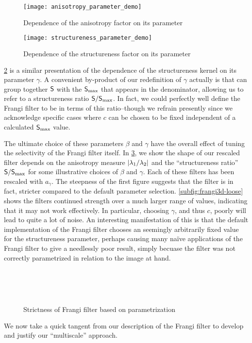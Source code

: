 \begin{figure}[t] \centering
  \texttt{[image: anisotropy\_parameter\_demo]}
  \caption{Dependence of the anisotropy factor on its parameter}
  \label{fig:anisotropy-parameter-demo}
\end{figure}

\begin{figure}[t] \centering
  \texttt{[image: structureness\_parameter\_demo]}
  \caption{Dependence of the structureness factor on its parameter}
  \label{fig:structureness-parameter-demo}
\end{figure}

\cref{fig:structureness-parameter-demo} is a similar presentation of the dependence of the structureness kernel on its parameter $\gamma$.
A convenient by-product of our redefinition of $\gamma$ actually is that can group together $\mathsf{S}$ with the $\mathsf{S}_{\max}$ that appears in the denominator, allowing us to refer to a structureness ratio $\mathsf{S}/\mathsf{S}_{\max}$. In fact, we could perfectly well define the Frangi filter to be in terms of this ratio--though we refrain presently since we acknowledge specific cases where $c$ can be chosen to be fixed independent of a calculated $\mathsf{S}_{\max}$ value.


The ultimate choice of these parameters $\beta$ and $\gamma$ have the overall effect of tuning the selectivity of the Frangi filter itself. In \cref{fig:frangi3d-selection}, we show the shape of our rescaled filter depends on the anisotropy measure $\vert\lambda_1 / \lambda_2\vert$ and the ``structureness ratio'' $\mathsf{S}/\mathsf{S}_{\max}$ for some illustrative choices of $\beta$ and $\gamma$. Each of these filters has been rescaled with $a_\gamma$. The steepness of the first figure suggests that the filter is in fact, stricter compared to the default parameter selection. \cref{subfig:frangi3d-loose} shows the filters continued strength over a much larger range of values, indicating that it may not work effectively. In particular, choosing $\gamma$, and thus $c$, poorly will lead to quite a lot of noise.
An interesting manifestation of this is that the default implementation of the Frangi filter \cite{scipy} chooses an seemingly arbitrarily fixed value for the structureness parameter, perhaps causing many na\"ive applications of the Frangi filter to give a needlessly poor result, simply becuase the filter was not correctly parametrized in relation to the image at hand.

\begin{figure}[t] \centering
\subfloat[Strict]{\texttt{[image: 4-rs]}} \label{subfig:frangi3d-strict} \\
\subfloat[Standard]{\texttt{[image: 14-rs]}} \label{subfig:frangi3d-default} \\
 \label{subfig:frangi3d-loose} \\
\caption{Strictness of Frangi filter based on parametrization}
\label{fig:frangi3d-selection}
\end{figure}

	We now take a quick tangent from our description of the Frangi filter to develop and justify our ``multiscale'' approach.
	
